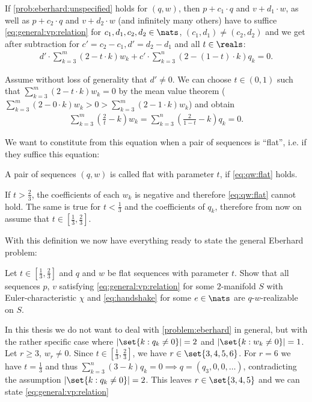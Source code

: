If \autoref{prob:eberhard:unspecified} holds for $(q, w)$, then $p + c_1 \cdot q$ and $v + d_1 \cdot w$, as well as $p + c_2 \cdot q$ and $v + d_2 \cdot w$ (and infinitely many others) have to suffice \autoref{eq:general:vp:relation} for $c_1, d_1, c_2, d_2 \in \nats$, $(c_1, d_1) \neq (c_2, d_2)$ and we get after subtraction for $c' = c_2 - c_1, d' = d_2 - d_1$ and all $t \in \reals$:
\begin{align*}
  d' \cdot \sum_{k=3}^m \left(2 - t \cdot k \right) w_k + c' \cdot \sum_{k=3}^n \left( 2 - (1 - t) \cdot k \right) q_k = 0. 
\end{align*}

Assume without loss of generality that $d' \neq 0$. We can choose $t \in (0, 1)$ such that $\sum_{k=3}^m (2 - t \cdot k) w_k = 0$ by the mean value theorem ($\sum_{k=3}^m (2 - 0 \cdot k) w_k > 0 > \sum_{k=3}^m (2 - 1 \cdot k) w_k$) and obtain
\begin{align}
    \sum_{k=3}^m \left(\frac{2}{t} - k \right) w_k = \sum_{k=3}^n \left( \frac{2}{1-t} - k \right) q_k = 0. \label{eq:qw:flat}
\end{align}


We want to constitute from this equation when a pair of sequences is ``flat'', i.e. if they suffice this equation:

\begin{definition}
  A pair of sequences $(q, w)$ is called flat with parameter $t$, if \autoref{eq:qw:flat} holds.
\end{definition}

If $t > \frac{2}{3}$, the coefficients of each $w_k$ is negative and therefore \autoref{eq:qw:flat} cannot hold. The same is true for $t < \frac{1}{3}$ and the coefficients of $q_k$, therefore from now on assume that $t \in \left[\frac{1}{3}, \frac{2}{3}\right]$.

With this definition we now have everything ready to state the general {\sc Eberhard} problem:

\begin{problem}\label{problem:eberhard}
  Let $ t \in \left[\frac{1}{3}, \frac{2}{3}\right]$ and $q$ and $w$ be flat sequences with parameter $t$. Show that all sequences $p$, $v$ satisfying \autoref{eq:general:vp:relation} for some $2$-manifold $S$ with {\sc Euler}-characteristic $\chi$ and \autoref{eq:handshake} for some $e \in \nats$ are $q$-$w$-realizable on $S$.
\end{problem}

In this thesis we do not want to deal with \autoref{problem:eberhard} in general, but with the rather specific case where $|\set{k : q_k \neq 0}| = 2$ and $|\set{k : w_k \neq 0}| = 1$. Let $r \geq 3$, $w_r \neq 0$. Since $t \in \left[\frac{1}{3}, \frac{2}{3}\right]$, we have $r \in \set{3, 4, 5, 6}$. For $r = 6$ we have $t = \frac{1}{3}$ and thus $\sum_{k=3}^n \left(3 - k \right) q_k = 0 \implies q = (q_3, 0, 0, \dots)$, contradicting the assumption $|\set{k : q_k \neq 0}| = 2$. This leaves $r \in \set{3, 4, 5}$ and we can state \autoref{eq:general:vp:relation} 

